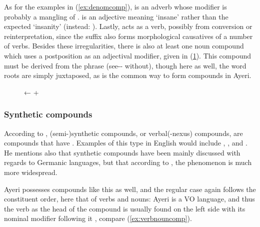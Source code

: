 As for the examples in (\ref{ex:denomcomp}),  is an
adverb whose modifier is probably a mangling of .
 is an adjective meaning `insane' rather than the
expected `insanity' (instead: ). Lastly,
 acts as a verb, possibly from conversion or
reinterpretation, since the suffix  also forms morphological
causatives of a number of verbs. Besides these irregularities, there is also at
least one noun compound which uses a postposition as an adjectival modifier,
given in (\ref{ex:nounpostposcomp}). This compound must be derived from the
phrase  (see-\Nmlz{}-\Loc{}
without), though here as well, the word roots are simply juxtaposed, as is the
common way to form compounds in Ayeri.

\begin{figure}[h]
\ex\label{ex:nounpostposcomp}
	← 
	+ 
\xe
\end{figure}

\subsubsection{Synthetic compounds}

According to \citet{bauer2001}, (semi-)synthetic compounds, or verbal(-nexus)
compounds, are compounds that have . Examples of this type in English would include
, , and . He mentions also 
that synthetic compounds have been mainly discussed with regards to Germanic
languages, but that according to \citet[3608]{lieber1994}, the phenomenon is
much more widespread.

Ayeri possesses compounds like this as well, and the regular case again follows
the constituent order, here that of verbs and nouns: Ayeri is a VO language,
and thus the verb as the head of the compound is usually found on the left side
with its nominal modifier following it \citep[compare][129--133]{gaeta2008},
compare (\ref{ex:verbnouncomp}).

